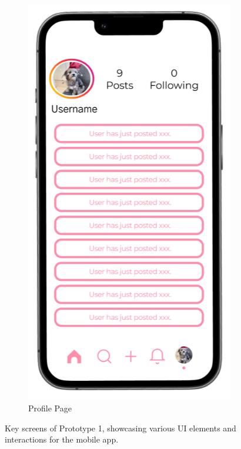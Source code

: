 \begin{figure}[h]
\begin{subfigure}[b]{0.3\textwidth}
    \includegraphics[width=\textwidth]{Figures/profile.png}
    \caption{Profile Page}
    \label{fig:profile}
  \end{subfigure}
  \caption{Key screens of Prototype 1, showcasing various UI elements and interactions for the mobile app.}
  \label{fig:prototype1_screens_2}
\end{figure}

